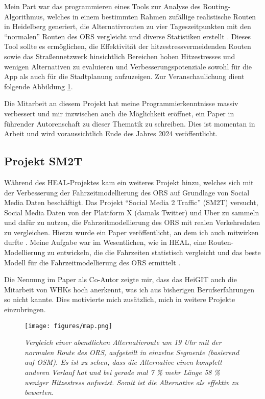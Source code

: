 \documentclass[11pt]{article}
\begin{document}
Mein Part war das programmieren eines Tools zur Analyse des Routing-Algorithmus, welches in einem bestimmten Rahmen zufällige realistische Routen in Heidelberg generiert, die Alternativrouten zu vier Tageszeitpunkten mit den \enquote{normalen} Routen des ORS vergleicht und diverse Statistiken erstellt \autocite{HeiGIT2024e}. Dieses Tool sollte es ermöglichen, die Effektivität der hitzestressvermeidenden Routen sowie das Straßennetzwerk hinsichtlich Bereichen hohen Hitzestresses und wenigen Alternativen zu evaluieren und Verbesserungspotenziale sowohl für die App als auch für die Stadtplanung aufzuzeigen. Zur Veranschaulichung dient folgende Abbildung \ref{fig:HEAL}.

Die Mitarbeit an diesem Projekt hat meine Programmierkenntnisse massiv verbessert und mir inzwischen auch die Möglichkeit eröffnet, ein Paper in führender Autorenschaft zu dieser Thematik zu schreiben. Dies ist momentan in Arbeit und wird voraussichtlich Ende des Jahres 2024 veröffentlicht.

\subsection{Projekt SM2T}

Während des HEAL-Projektes kam ein weiteres Projekt hinzu, welches sich mit der Verbesserung der Fahrzeitmodellierung des ORS auf Grundlage von Social Media Daten beschäftigt. Das Projekt \enquote{Social Media 2 Traffic} (SM2T) \autocite{SM2T2024} versucht, Social Media Daten von der Plattform X (damals Twitter) und Uber zu sammeln und dafür zu nutzen, die Fahrzeitmodellierung des ORS mit realen Verkehrsdaten zu vergleichen. Hierzu wurde ein Paper veröffentlicht, an dem ich auch mitwirken durfte \autocite{Ludwig.Psotta.ea2023}. Meine Aufgabe war im Wesentlichen, wie in HEAL, eine Routen-Modellierung zu entwickeln, die die Fahrzeiten statistisch vergleicht und das beste Modell für die Fahrzeitmodellierung des ORS ermittelt \autocite{HeiGIT2023}.

Die Nennung im Paper als Co-Autor zeigte mir, dass das HeiGIT auch die Mitarbeit von WHKs hoch anerkennt, was ich aus bisherigen Berufserfahrungen so nicht kannte. Dies motivierte mich zusätzlich, mich in weitere Projekte einzubringen.

\begin{figure}[!h]
    \centering
    \texttt{[image: figures/map.png]}
    \caption{\emph{Vergleich einer abendlichen Alternativroute um 19 Uhr mit der normalen Route des ORS, aufgeteilt in einzelne Segmente (basierend auf OSM). Es ist zu sehen, dass die Alternative einen komplett anderen Verlauf hat und bei gerade mal 7 \% mehr Länge 58 \% weniger Hitzestress aufweist. Somit ist die Alternative als effektiv zu bewerten.}}
    \label{fig:HEAL}
\end{figure}
\end{document}
